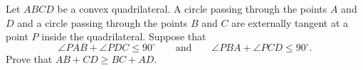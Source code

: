 Let $ABCD$ be a convex quadrilateral. A circle passing through the points $A$ and $D$ and a circle passing through the points $B$ and $C$ are externally tangent at a point $P$ inside the quadrilateral. Suppose that
\[
\angle PAB + \angle PDC \leq 90^{\circ} \qquad \text{and} \qquad \angle PBA + \angle PCD \leq 90^{\circ}.
\]
Prove that $AB + CD \geq BC + AD$.
